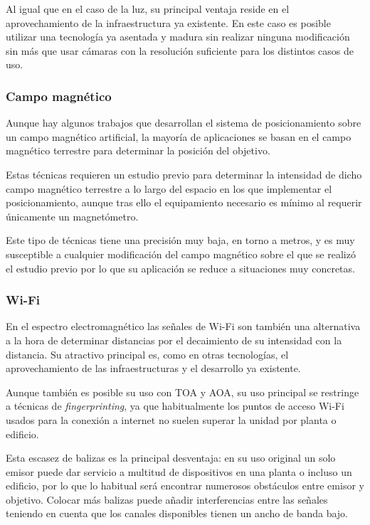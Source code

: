 Al igual que en el caso de la luz, su principal ventaja reside en el aprovechamiento de la infraestructura ya existente.
En este caso es posible utilizar una tecnología ya asentada y madura sin realizar ninguna modificación sin más que usar cámaras con la resolución suficiente para los distintos casos de uso.

\subsubsection{Campo magnético}

Aunque hay algunos trabajos que desarrollan el sistema de posicionamiento sobre un campo magnético artificial, la mayoría de aplicaciones se basan en el campo magnético terrestre para determinar la posición del objetivo.

Estas técnicas requieren un estudio previo para determinar la intensidad de dicho campo magnético terrestre a lo largo del espacio en los que implementar el posicionamiento, aunque tras ello el equipamiento necesario es mínimo al requerir únicamente un magnetómetro.

Este tipo de técnicas tiene una precisión muy baja, en torno a metros, y es muy susceptible a cualquier modificación del campo magnético sobre el que se realizó el estudio previo por lo que su aplicación se reduce a situaciones muy concretas.

\subsubsection{Wi-Fi}

En el espectro electromagnético las señales de Wi-Fi son también una alternativa a la hora de determinar distancias por el decaimiento de su intensidad con la distancia.
Su atractivo principal es, como en otras tecnologías, el aprovechamiento de las infraestructuras y el desarrollo ya existente.

Aunque también es posible su uso con TOA y AOA, su uso principal se restringe a técnicas de \textit{fingerprinting}, ya que habitualmente los puntos de acceso Wi-Fi usados para la conexión a internet no suelen superar la unidad por planta o edificio.

Esta escasez de balizas es la principal desventaja: en su uso original un solo emisor puede dar servicio a multitud de dispositivos en una planta o incluso un edificio, por lo que lo habitual será encontrar numerosos obstáculos entre emisor y objetivo.
Colocar más balizas puede añadir interferencias entre las señales teniendo en cuenta que los canales disponibles tienen un ancho de banda bajo.

